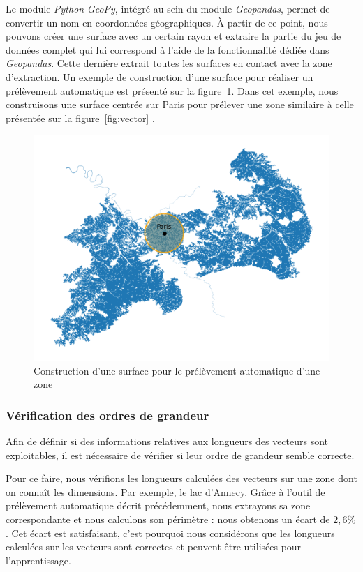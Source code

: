 Le module \emph{Python} \emph{GeoPy}, intégré au sein du module \emph{Geopandas}, permet de convertir un nom en coordonnées géographiques.
À partir de ce point, nous pouvons créer une surface avec un certain rayon et extraire la partie du jeu de données complet qui lui correspond à l'aide de la fonctionnalité dédiée dans \emph{Geopandas}.
Cette dernière extrait toutes les surfaces en contact avec la zone d'extraction.
Un exemple de construction d'une surface pour réaliser un prélèvement automatique est présenté sur la figure~\ref{fig:zone-paris}.
Dans cet exemple, nous construisons une surface centrée sur Paris pour prélever une zone similaire à celle présentée sur la figure~\ref{fig:vector} .

\begin{figure}[!h]
    \centering
    \includegraphics[scale=0.5]{figures/zone-paris}
    \caption{Construction d'une surface pour le prélèvement automatique d'une zone}
    \label{fig:zone-paris}
\end{figure}

\subsubsection{Vérification des ordres de grandeur}

Afin de définir si des informations relatives aux longueurs des vecteurs sont exploitables, il est nécessaire de vérifier si leur ordre de grandeur semble correcte.

Pour ce faire, nous vérifions les longueurs calculées des vecteurs sur une zone dont on connaît les dimensions.
Par exemple, le lac d'Annecy.
Grâce à l'outil de prélèvement automatique décrit précédemment, nous extrayons sa zone correspondante et nous calculons son périmètre : nous obtenons un écart de $2,6\%$.
Cet écart est satisfaisant, c'est pourquoi nous considérons que les longueurs calculées sur les vecteurs sont correctes et peuvent être utilisées pour l'apprentissage.

